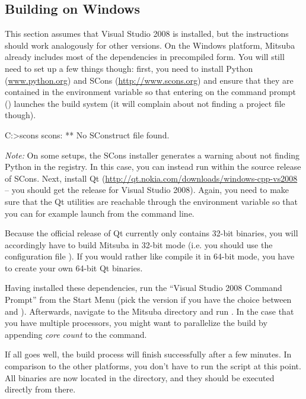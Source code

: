 \subsection{Building on Windows}
This section assumes that Visual Studio 2008 is installed, but the instructions should work analogously for other versions.
On the Windows platform, Mitsuba already includes most of the dependencies in precompiled form.
You will still need to set up a few things though: first, you need to install Python 
(\url{www.python.org}) and SCons (\url{http://www.scons.org}) and ensure that they are contained
in the  environment variable so that entering  on the command prompt
() launches the build system (it will complain about not finding a project file though).
\begin{shell}
C:\Users\Wenzel>scons
scons: ** No SConstruct file found.
\end{shell}
\emph{Note: }On some setups, the SCons installer generates a warning about not finding Python in the registry. In this case, you can instead run  within the source release of SCons.
Next, install Qt (\url{http://qt.nokia.com/downloads/windows-cpp-vs2008} -- you should get the release for Visual Studio 2008). Again, you need to make sure that the 
Qt utilities are reachable through the  environment variable so that you can for example launch  from the command line.

Because the official release of Qt currently only contains 32-bit binaries, you will accordingly have to 
build Mitsuba in 32-bit mode (i.e. you should use the configuration file ). If you would rather like compile it in 64-bit mode, you have to create
your own 64-bit Qt binaries.

Having installed these dependencies, run the ``Visual Studio 2008 Command 
Prompt'' from the Start Menu (pick the  version if you have the choice between  and ). Afterwards,
navigate to the Mitsuba directory and run . 
In the case that you have multiple processors, you might want to parallelize the build by appending \emph{core count} to the  command.

If all goes well, the build process will finish successfully after a few
minutes. In comparison to the other platforms, you don't have to run the  script at this point. 
All binaries are now located in the  directory, and they should be executed directly from there.
